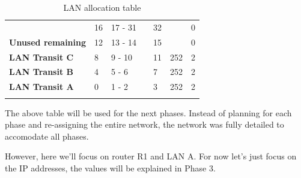\documentclass[11pt,a4paper]{report}
\begin{document}
\begin{center}
\begin{longtable}{lllllll}
                                                               & \cellcolor[HTML]{BFBFBF}16 & 17 - 31             &                 & 32                                     &                                          & 0                                    \\
                \multirow{-2}{*}{\textbf{Unused remaining}}    & \cellcolor[HTML]{C09FE5}12 & 13 - 14             &                 & 15                                     &                                          & 0                                    \\ \hline
                \cellcolor[HTML]{C09FE5}\textbf{LAN Transit C} & 8                          & 9 - 10              &                 & 11                                     & 252                                      & 2                                    \\
                \cellcolor[HTML]{C09FE5}\textbf{LAN Transit B} & 4                          & 5 - 6               &                 & 7                                      & 252                                      & 2                                    \\
                \cellcolor[HTML]{C09FE5}\textbf{LAN Transit A} & 0                          & 1 - 2               &                 & 3                                      & 252                                      & 2                                    \\ \hline
                \caption{LAN allocation table}
                \label{tab:lanalloctable}\\
            \end{longtable}
        \end{center}

        The above table will be used for the next phases. Instead of planning for each phase and re-assigning the entire network, the network was fully detailed to accomodate all phases.
        
        However, here we'll focus on router R1 and LAN A. For now let's just focus on the IP addresses, the values will be explained in Phase 3.
\end{document}
